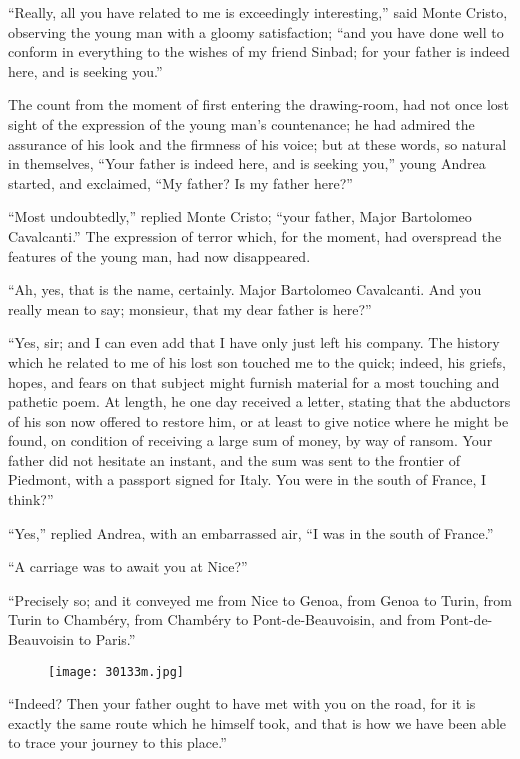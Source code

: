 “Really, all you have related to me is exceedingly interesting,” said
Monte Cristo, observing the young man with a gloomy satisfaction; “and
you have done well to conform in everything to the wishes of my friend
Sinbad; for your father is indeed here, and is seeking you.”

The count from the moment of first entering the drawing-room, had not
once lost sight of the expression of the young man’s countenance; he
had admired the assurance of his look and the firmness of his voice;
but at these words, so natural in themselves, “Your father is indeed
here, and is seeking you,” young Andrea started, and exclaimed, “My
father? Is my father here?”

“Most undoubtedly,” replied Monte Cristo; “your father, Major
Bartolomeo Cavalcanti.” The expression of terror which, for the moment,
had overspread the features of the young man, had now disappeared.

“Ah, yes, that is the name, certainly. Major Bartolomeo Cavalcanti. And
you really mean to say; monsieur, that my dear father is here?”

“Yes, sir; and I can even add that I have only just left his company.
The history which he related to me of his lost son touched me to the
quick; indeed, his griefs, hopes, and fears on that subject might
furnish material for a most touching and pathetic poem. At length, he
one day received a letter, stating that the abductors of his son now
offered to restore him, or at least to give notice where he might be
found, on condition of receiving a large sum of money, by way of
ransom. Your father did not hesitate an instant, and the sum was sent
to the frontier of Piedmont, with a passport signed for Italy. You were
in the south of France, I think?”

“Yes,” replied Andrea, with an embarrassed air, “I was in the south of
France.”

“A carriage was to await you at Nice?”

“Precisely so; and it conveyed me from Nice to Genoa, from Genoa to
Turin, from Turin to Chambéry, from Chambéry to Pont-de-Beauvoisin, and
from Pont-de-Beauvoisin to Paris.”

\begin{figure}[ht]
\texttt{[image: 30133m.jpg]}
\end{figure}

“Indeed? Then your father ought to have met with you on the road, for
it is exactly the same route which he himself took, and that is how we
have been able to trace your journey to this place.”

